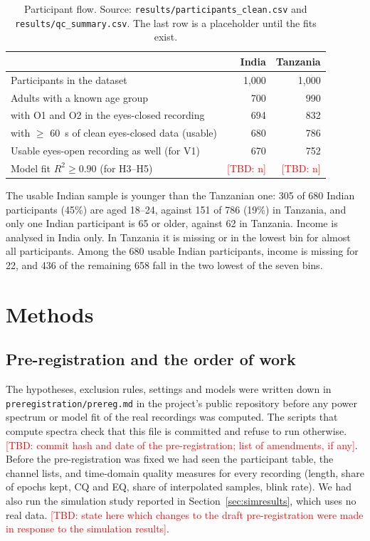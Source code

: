 \documentclass[11pt,a4paper]{article}
\newcommand{\TBD}[1]{\textcolor{red}{[TBD: #1]}}
\begin{document}
\begin{table}[ht]
\centering
\caption{Participant flow. Source: \texttt{results/participants\_clean.csv} and
\texttt{results/qc\_summary.csv}. The last row is a placeholder until the fits exist.}
\label{tab:flow}
\begin{tabular}{lrr}
\toprule
 & India & Tanzania \\
\midrule
Participants in the dataset & 1,000 & 1,000 \\
Adults with a known age group & 700 & 990 \\
\quad with O1 and O2 in the eyes-closed recording & 694 & 832 \\
\quad with $\geq$ 60~s of clean eyes-closed data (usable) & 680 & 786 \\
Usable eyes-open recording as well (for V1) & 670 & 752 \\
Model fit $R^2 \geq 0.90$ (for H3--H5) & \TBD{n} & \TBD{n} \\
\bottomrule
\end{tabular}
\end{table}

The usable Indian sample is younger than the Tanzanian one: 305 of 680 Indian participants
(45\%) are aged 18--24, against 151 of 786 (19\%) in Tanzania, and only one Indian
participant is 65 or older, against 62 in Tanzania. Income is analysed in India only. In
Tanzania it is missing or in the lowest bin for almost all participants. Among the 680
usable Indian participants, income is missing for 22, and 436 of the remaining 658 fall in
the two lowest of the seven bins.

\section{Methods}

\subsection{Pre-registration and the order of work}

The hypotheses, exclusion rules, settings and models were written down in
\texttt{preregistration/prereg.md} in the project's public repository before any power
spectrum or model fit of the real recordings was computed. The scripts that compute
spectra check that this file is committed and refuse to run otherwise. \TBD{commit hash
and date of the pre-registration; list of amendments, if any}. Before the pre-registration
was fixed we had seen the participant table, the channel lists, and time-domain quality
measures for every recording (length, share of epochs kept, CQ and EQ, share of
interpolated samples, blink rate). We had also run the simulation study reported in
Section~\ref{sec:simresults}, which uses no real data. \TBD{state here which changes to
the draft pre-registration were made in response to the simulation results}.
\end{document}
